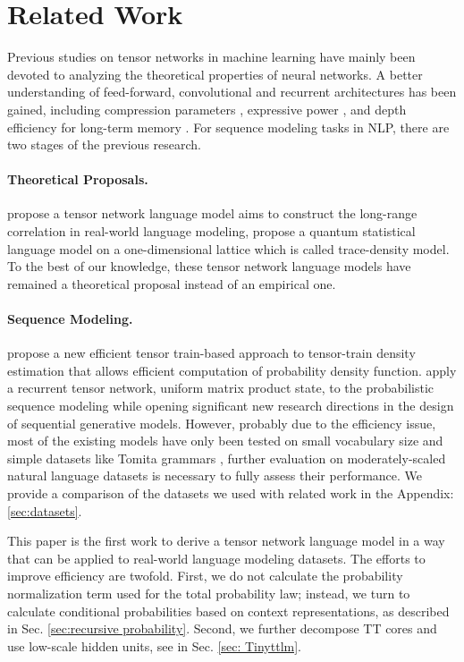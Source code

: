 \section{Related Work}

Previous studies on tensor networks in machine learning have mainly been devoted to analyzing the theoretical properties of neural networks. A better understanding of feed-forward, convolutional and recurrent architectures has been gained, including compression parameters \citep{novikov2015tensorizing}, expressive power \citep{cohen2016expressive, cohen2016convolutional, khrulkov2018expressive}, and depth efficiency for long-term memory \citep{levine2018benefits}. For sequence modeling tasks in NLP, there are two stages of the previous research.

\paragraph{Theoretical Proposals.}
\citep{pestun2017tensor} propose a tensor network language model aims to construct the long-range correlation in real-world language modeling, \citep{pestun2017language} propose a quantum statistical language model on a one-dimensional lattice which is called trace-density model. 
To the best of our knowledge, these tensor network language models have remained a theoretical proposal instead of an empirical one. 


\paragraph{Sequence Modeling.} \cite{novikov2021tensor} propose a new efficient tensor train-based approach to tensor-train density estimation that allows efficient computation of probability density function. \cite{miller2021tensor} apply a recurrent tensor network, uniform matrix product state, to the probabilistic sequence modeling while opening significant new research directions in the design of sequential generative models. However, probably due to the efficiency issue, most of the existing models have only been tested on small vocabulary size and simple datasets like Tomita grammars \citep{tomita1982dynamic}, further evaluation on moderately-scaled natural language datasets is necessary to fully assess their performance. We provide a comparison of the datasets we used with related work in the Appendix: \ref{sec:datasets}.

This paper is the first work to  derive a tensor network language model in a way that can be applied to real-world language modeling datasets. The efforts to improve efficiency are twofold. First, we do not calculate the probability normalization term used for the total probability law; instead, we turn to  calculate conditional probabilities based on context representations, as described in Sec. \ref{sec:recursive probability}.
Second, we further decompose TT cores and use  low-scale hidden units, see in Sec. \ref{sec: Tinyttlm}.




